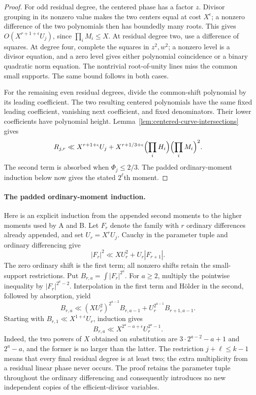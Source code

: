 \documentclass[11pt]{amsart}
\theoremstyle{definition}
\numberwithin{equation}{section}
\begin{document}
\begin{proof}
For odd residual degree, the centered phase has a factor $z$.
Divisor grouping in its nonzero value makes the two centers equal
at cost $X^\epsilon$; a nonzero difference of the two polynomials
then has boundedly many roots. This gives
$O(X^{r+1+\epsilon}U_j)$, since $\prod_iM_i\le X$.
At residual degree two, use a difference of squares. At degree
four, complete the squares in $z^2,w^2$; a nonzero level is a
divisor equation, and a zero level gives either polynomial
coincidence or a binary quadratic norm equation. The nontrivial
root-of-unity lines miss the common small supports. The same
bound follows in both cases.

For the remaining even residual degrees, divide the common-shift
polynomial by its leading coefficient. The two resulting centered
polynomials have the same fixed leading coefficient, vanishing
next coefficient, and fixed denominators. Their lower coefficients
have polynomial height. Lemma~\ref{lem:centered-curve-intersections}
gives
\[
 R_{j,r}\ll X^{r+1+\epsilon}U_j+
 X^{r+1/3+\epsilon}\Bigl(\prod_iH_i\Bigr)
                         \Bigl(\prod_iM_i\Bigr)^2.
\]
The second term is absorbed when $\Phi_j\le2/3$.
The padded ordinary-moment induction below now gives the stated
$2^\ell$th moment.
\end{proof}

\paragraph{The padded ordinary-moment induction.}
Here is an explicit induction from the appended second moments to the
higher moments used by A and B.  Let $F_r$ denote the family with $r$
ordinary differences already appended, and set $U_r=X^rU_j$.
Cauchy in the parameter tuple and ordinary differencing give
\[
                     |F_r|^2\ll XU_r^2+U_r|F_{r+1}|.
\]
The zero ordinary shift is the first term; all nonzero shifts retain the
small-support restrictions.  Put
$B_{r,a}=\int|F_r|^{2^a}$.  For $a\ge2$, multiply the pointwise inequality
by $|F_r|^{2^a-2}$.  Interpolation in the first term and H\"older in the
second, followed by absorption, yield
\[
 B_{r,a}\ll (XU_r^2)^{2^{a-2}}B_{r,a-1}
                  +U_r^{2^{a-1}}B_{r+1,a-1}.
\]
Starting with $B_{r,1}\ll X^{1+\epsilon}U_r$, induction gives
\[
                  B_{r,a}\ll X^{2^a-a+\epsilon}U_r^{2^a-1}.
\]
Indeed, the two powers of $X$ obtained on substitution are
$3\cdot2^{a-2}-a+1$ and $2^a-a$, and the former is no larger than the
latter.  The restriction $j+\ell\le k-1$ means that every final residual
degree is at least two; the extra multiplicity from a residual linear
phase never occurs.  The proof retains the parameter tuple throughout the
ordinary differencing and consequently introduces no new independent
copies of the efficient-divisor variables.
\end{document}
